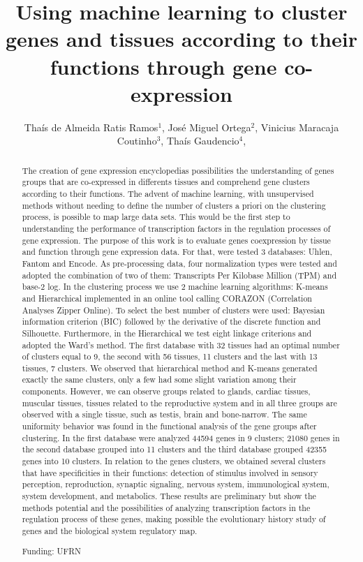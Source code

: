 \documentclass[twoside]{article}
\title{\vspace{-15mm}\fontsize{24pt}{10pt}\selectfont\textbf{ Using machine learning to cluster genes and tissues according to their functions through gene co-expression }} %
\author{ Thaís de Almeida Ratis Ramos$^{1}$, José Miguel Ortega$^{2}$, Vinicius Maracaja Coutinho$^{3}$, Thaís Gaudencio$^{4}$, }
\affil{ 1 UFRN

2 Universidade Federal de Minas Gerais, Laboratório de Biodados.

3 Universidad Mayor

4 UFPB

 }
\date{}
\begin{document}
  
  
  \maketitle %
  
  
  \thispagestyle{fancy} %
  
  
  \begin{abstract}
  The creation of gene expression encyclopedias possibilities the understanding of genes groups that are co-expressed in differents tissues and comprehend gene clusters according to their functions. The advent of machine learning, with unsupervised methods without needing to define the number of clusters a priori on the clustering process, is possible to map large data sets. This would be the first step to understanding the performance of transcription factors in the regulation processes of gene expression. The purpose of this work is to evaluate genes coexpression by tissue and function through gene expression data. For that, were tested 3 databases: Uhlen, Fantom and Encode. As pre-processing data, four normalization types were tested and adopted the combination of two of them: Transcripts Per Kilobase Million (TPM) and base-2 log. In the clustering process we use 2 machine learning algorithms: K-means and Hierarchical implemented in an online tool calling CORAZON (Correlation Analyses Zipper Online). To select the best number of clusters were used: Bayesian information criterion (BIC) followed by the derivative of the discrete function and Silhouette. Furthermore, in the Hierarchical we test eight linkage criterions and adopted the Ward’s method. The first database with 32 tissues had an optimal number of clusters equal to 9, the second with 56 tissues, 11 clusters and the last with 13 tissues, 7 clusters. We observed that hierarchical method and K-means generated exactly the same clusters, only a few had some slight variation among their components. However, we can observe groups related to glands, cardiac tissues, muscular tissues, tissues related to the reproductive system and in all three groups are observed with a single tissue, such as testis, brain and bone-narrow. The same uniformity behavior was found in the functional analysis of the gene groups after clustering. In the first database were analyzed 44594 genes in 9 clusters; 21080 genes in the second database grouped into 11 clusters and the third database grouped 42355 genes into 10 clusters. In relation to the genes clusters, we obtained several clusters that have specificities in their functions: detection of stimulus involved in sensory perception, reproduction, synaptic signaling, nervous system, immunological system, system development, and metabolics. These results are preliminary but show the methods potential and the possibilities of analyzing transcription factors in the regulation process of these genes, making possible the evolutionary history study of genes and the biological system regulatory map.
  
  Funding: UFRN \\ 
  \end{abstract}
  
\end{document}
